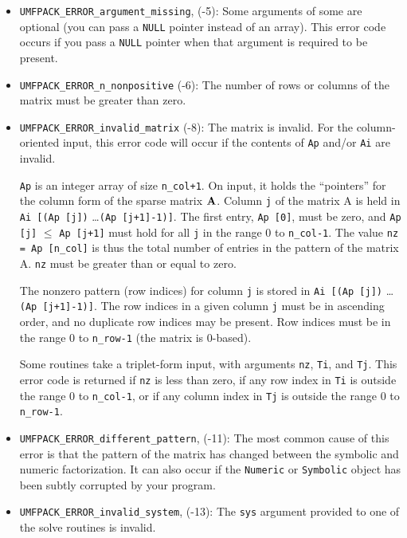 \documentclass[11pt]{article}
\newcommand{\m}[1]{{\bf{#1}}}       %
\begin{document}
\begin{itemize}
\item {\tt UMFPACK\_ERROR\_argument\_missing},  (-5):  
    Some arguments of some are optional (you can pass a {\tt NULL} pointer
    instead of an array).  This error code occurs if you pass a {\tt NULL}
    pointer when that argument is required to be present.

\item {\tt UMFPACK\_ERROR\_n\_nonpositive}  (-6):  
    The number of rows or columns of the matrix must be greater than zero.

\item {\tt UMFPACK\_ERROR\_invalid\_matrix}  (-8):  
    The matrix is invalid.  For the column-oriented input, this error
    code will occur if the contents of {\tt Ap} and/or {\tt Ai} are invalid.

    {\tt Ap} is an integer array of size {\tt n\_col+1}.
    On input, it holds the
    ``pointers'' for the column form of the sparse matrix $\m{A}$.
    Column {\tt j} of
    the matrix A is held in {\tt Ai [(Ap [j])} \ldots {\tt (Ap [j+1]-1)]}.
    The first entry, {\tt Ap [0]}, must be zero,
    and {\tt Ap [j]} $\le$ {\tt Ap [j+1]} must hold for all
    {\tt j} in the range 0 to {\tt n\_col-1}.
    The value {\tt nz = Ap [n\_col]} is thus the
    total number of entries in the pattern of the matrix A.
    {\tt nz} must be greater than or equal to zero.

    The nonzero pattern (row indices) for column {\tt j} is stored in
    {\tt Ai [(Ap [j])} \ldots {\tt (Ap [j+1]-1)]}.  The row indices in a given
    column {\tt j}
    must be in ascending order, and no duplicate row indices may be present.
    Row indices must be in the range 0 to {\tt n\_row-1}
    (the matrix is 0-based).

    Some routines take a triplet-form input, with arguments
    {\tt nz}, {\tt Ti}, and {\tt Tj}.  This error code is returned
    if {\tt nz} is less than zero,
    if any row    index in {\tt Ti} is outside the range 0 to {\tt n\_col-1}, or
    if any column index in {\tt Tj} is outside the range 0 to {\tt n\_row-1}.

\item {\tt UMFPACK\_ERROR\_different\_pattern},  (-11):  
    The most common cause of this error is that the pattern of the
    matrix has changed between the symbolic and numeric factorization.
    It can also occur if the {\tt Numeric} or {\tt Symbolic} object has
    been subtly corrupted by your program.

\item {\tt UMFPACK\_ERROR\_invalid\_system},  (-13):  
    The {\tt sys} argument provided to one of the solve routines is invalid.


\end{itemize}
\end{document}

